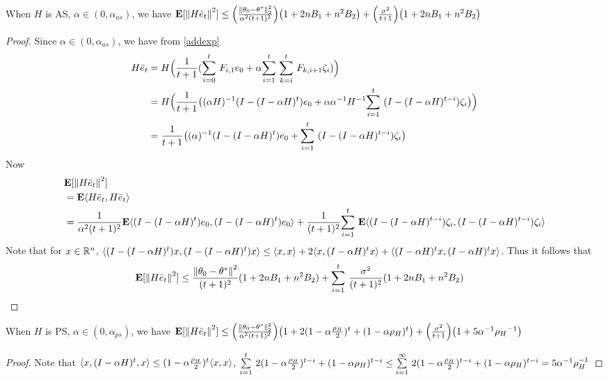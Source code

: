 \begin{theorem}\label{asaus}
When $H$ is AS, $\alpha \in (0,\alpha_{as})$, we have
$\E[\norm{H\eb_t}^2]\leq \Big(\frac{\norm{\theta_0-\ts}^2_2}{\alpha^2(t+1)^2}\Big)\big(1+2nB_1+n^2B_2\big)+\Big(\frac{\sigma^2}{t+1}\Big)\big(1+2nB_1+n^2B_2\big)$
\end{theorem}
\begin{proof}
Since $\alpha\in (0,\alpha_{as})$, we have from \eqref{addexp}
\begin{align*}
H\eb_t&=H\Big(\frac{1}{t+1}(\ous{\sum}{i=0}{t} F_{i,1} e_0+ \alpha\ous{\sum}{i=1}{t} \ous{\sum}{k=i}{t} F_{k,i+1}  \zeta_i )\Big)\\
&=H\Big(\frac{1}{t+1}\big((\alpha H)^{-1}(I-(I-\alpha H)^t)e_0+ \alpha \alpha^{-1}H^{-1}\ous{\sum}{i=1}{t}(I-(I-\alpha H)^{t-i}) \zeta_i\big)\Big)\\
&=\frac{1}{t+1}\big((\alpha)^{-1}(I-(I-\alpha H)^t)e_0+ \ous{\sum}{i=1}{t}(I-(I-\alpha H)^{t-i}) \zeta_i\big)
\end{align*}
Now
\begin{align*}
&\E[\norm{H\eb_t}^2]\\
&=\E\ip{H\eb_t,H\eb_t}\\
&=\frac{1}{\alpha^2(t+1)^2}\E\ip{(I-(I-\alpha H)^t)e_0,(I-(I-\alpha H)^t)e_0}+\frac{1}{(t+1)^2}\ous{\sum}{i=1}{t}\E\ip{(I-(I-\alpha H)^{t-i}) \zeta_i,(I-(I-\alpha H)^{t-i}) \zeta_i}
\end{align*}
Note that for $x\in \R^n$, $\ip{(I-(I-\alpha H)^t)x,(I-(I-\alpha H)^t)x}\leq \ip{x,x}+2\ip{x,(I-\alpha H)^tx}+\ip{(I-\alpha H)^t x,(I-\alpha H)^t x}$. Thus it follows that
\begin{align*}
&\E[\norm{H\eb_t}^2]\leq \frac{\norm{\theta_0-\ts}^2}{(t+1)^2} (1+2nB_1+n^2B_2)+\ous{\sum}{i=1}{t}\frac{\sigma^2}{(t+1)^2}(1+2nB_1+n^2B_2)
\end{align*}
\end{proof}


\begin{theorem}\label{psaus}
When $H$ is PS, $\alpha \in (0,\alpha_{ps})$, we have
$\E[\norm{H\eb_t}^2]\leq \Big(\frac{\norm{\theta_0-\ts}^2_2}{\alpha^2(t+1)^2}\Big)\big(1+2(1-\alpha\frac{\rho_H}{2})^t+(1-\alpha\rho_H)^t\big)+\Big(\frac{\sigma^2}{t+1}\Big)\big(1+5\alpha^{-1}{\rho_H}^{-1}\big)$
\end{theorem}
\begin{proof}
Note that $\ip{x,(I-\alpha H)^t,x}\leq (1-\alpha\frac{\rho_H}{2})^t \ip{x,x}$, $\ous{\sum}{i=1}{t} 2 (1-\alpha \frac{\rho_H}{2})^{t-i}+(1-\alpha {\rho_H})^{t-i}\leq \ous{\sum}{i=1}{\infty} 2 (1-\alpha \frac{\rho_H}{2})^{t-i}+(1-\alpha {\rho_H})^{t-i}=5\alpha^{-1}\rho_H^{-1}$
\end{proof}

